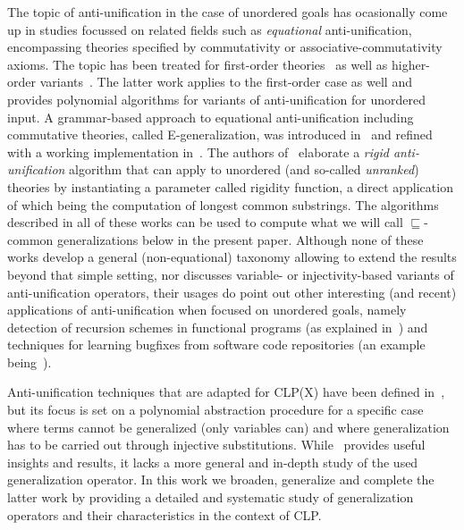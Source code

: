 The topic of anti-unification in the case of unordered goals has ocasionally come up in studies focussed on related fields such as \textit{equational} anti-unification, encompassing theories specified by commutativity or associative-commutativity axioms. The topic has been treated for first-order theories~\cite{order-sorted} as well as higher-order variants~\cite{kutsia_2020}. The latter work applies to the first-order case as well and provides polynomial algorithms for variants of anti-unification for unordered input. A grammar-based approach to equational anti-unification including commutative theories, called E-generalization, was introduced in~\cite{e-generalization} and refined with a working implementation in~\cite{e-generalization-improved}. The authors of~\cite{unranked-2-order-au} elaborate a \textit{rigid anti-unification} algorithm that can apply to unordered (and so-called \textit{unranked}) theories by instantiating a parameter called rigidity function, a direct application of which being the computation of longest common substrings. The algorithms described in all of these works can be used to compute what we will call $\sqsubseteq$-common generalizations below in the present paper. Although none of these works develop a general (non-equational) taxonomy allowing to extend the results beyond that simple setting, nor discusses variable- or injectivity-based variants of anti-unification operators, %
their usages do point out other interesting (and recent) applications of anti-unification when focused on unordered goals, namely detection of recursion schemes in functional programs (as explained in~\cite{BARWELL2018669}) and techniques for learning bugfixes from software code repositories (an example being~\cite{rolim2018learning}). 

Anti-unification techniques that are adapted for CLP(X) have been defined in~\cite{gen}, but its focus is set on a polynomial abstraction procedure for a specific case where terms cannot be generalized (only variables can) and where generalization has to be carried out through injective substitutions. 
%
While~\cite{gen} provides useful insights and results, it lacks a more general and in-depth study of the used generalization operator. In this work we broaden, generalize and complete the latter work by providing a detailed and systematic study of generalization operators and their characteristics in the context of CLP. 
%

